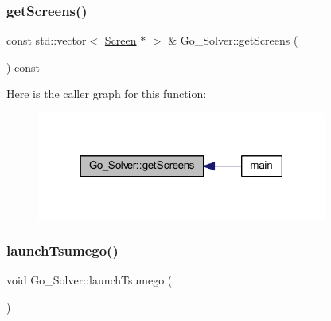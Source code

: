 \subsubsection{\texorpdfstring{get\+Screens()}{getScreens()}}
{\footnotesize\ttfamily const std\+::vector$<$ \hyperlink{class_screen}{Screen} $\ast$ $>$ \& Go\+\_\+\+Solver\+::get\+Screens (\begin{DoxyParamCaption}{ }\end{DoxyParamCaption}) const}

Here is the caller graph for this function\+:
\nopagebreak
\begin{figure}[H]
\begin{center}
\leavevmode
\includegraphics[width=270pt]{class_go___solver_aa86fa44c1be38ba004ff2f0475094cd1_icgraph}
\end{center}
\end{figure}
\mbox{\label{class_go___solver_a6ca744f1f4586c3f90f2e47915034baf}} 
\subsubsection{\texorpdfstring{launch\+Tsumego()}{launchTsumego()}}
{\footnotesize\ttfamily void Go\+\_\+\+Solver\+::launch\+Tsumego (\begin{DoxyParamCaption}{ }\end{DoxyParamCaption})}

